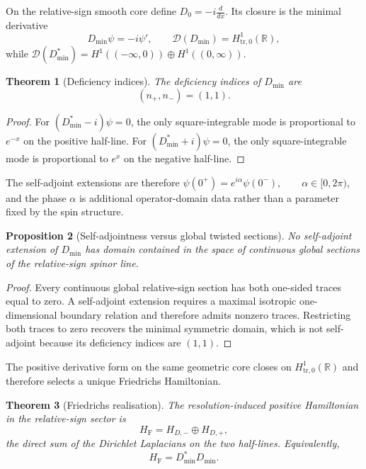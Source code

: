 \documentclass[11pt]{article}
\theoremstyle{plain}
\newtheorem{theorem}{Theorem}[section]
\newtheorem{proposition}[theorem]{Proposition}
\theoremstyle{definition}
\begin{document}
On the relative-sign smooth core define
\(D_0=-i\frac{d}{dx}\).
Its closure is the minimal derivative
\[
  D_{\min}\psi=-i\psi',
  \qquad
  \mathcal D(D_{\min})
  =
  H^1_{\mathrm{tr},0}(\mathbb R),
\]
while
\(\mathcal D(D_{\min}^*) = H^1((-\infty,0)) \oplus H^1((0,\infty))\).

\begin{theorem}[Deficiency indices]
\label{thm:L2-deficiency}
The deficiency indices of \(D_{\min}\) are
\[
  (n_+,n_-)=(1,1).
\]
\end{theorem}

\begin{proof}
For
\((D_{\min}^*-i)\psi=0\),
the only square-integrable mode is proportional to \(e^{-x}\) on the
positive half-line. For
\((D_{\min}^*+i)\psi=0\),
the only square-integrable mode is proportional to \(e^x\) on the negative
half-line.
\end{proof}

The self-adjoint extensions are therefore
\(\psi(0^+)=e^{i\alpha}\psi(0^-), \qquad \alpha\in[0,2\pi)\),
and the phase \(\alpha\) is additional operator-domain data rather than a
parameter fixed by the spin structure.

\begin{proposition}[Self-adjointness versus global twisted sections]
\label{prop:L2-SA-not-global}
No self-adjoint extension of \(D_{\min}\) has domain contained in the space
of continuous global sections of the relative-sign spinor line.
\end{proposition}

\begin{proof}
Every continuous global relative-sign section has both one-sided traces
equal to zero. A self-adjoint extension requires a maximal isotropic
one-dimensional boundary relation and therefore admits nonzero traces.
Restricting both traces to zero recovers the minimal symmetric domain,
which is not self-adjoint because its deficiency indices are \((1,1)\).
\end{proof}

The positive derivative form on the same geometric core closes on \(H^1_{\mathrm{tr},0}(\mathbb R)\) and therefore selects a unique Friedrichs Hamiltonian.

\begin{theorem}[Friedrichs realisation]
\label{thm:L2-Friedrichs}
The resolution-induced positive Hamiltonian in the relative-sign sector is
\[
  H_{\mathrm F}
  =
  H_{D,-}\oplus H_{D,+},
\]
the direct sum of the Dirichlet Laplacians on the two half-lines.
Equivalently,
\[
  H_{\mathrm F}=D_{\min}^*D_{\min}.
\]
\end{theorem}
\end{document}
